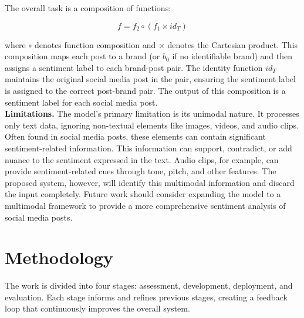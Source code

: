 \documentclass{article}
\begin{document}
The overall task is a composition of functions:

\[
    f = f_2 \circ (f_1 \times id_T)
\]

where $\circ$ denotes function composition and $\times$ denotes the Cartesian
product. This composition maps each post to a brand (or $b_0$ if no
identifiable brand) and then assigns a sentiment label to each brand-post pair.
The identity function $id_T$ maintains the original social media post in the
pair, ensuring the sentiment label is assigned to the correct post-brand pair.
The output of this composition is a sentiment label for each social media
post.\\

\newpage
\textbf{Limitations.} The model's primary limitation is its unimodal nature. It
processes only text data, ignoring non-textual elements like images, videos,
and audio clips. Often found in social media posts, these elements can contain
significant sentiment-related information. This information can support,
contradict, or add nuance to the sentiment expressed in the text. Audio clips,
for example, can provide sentiment-related cues through tone, pitch, and other
features. The proposed system, however, will identify this multimodal
information and discard the input completely. Future work should consider
expanding the model to a multimodal framework to provide a more comprehensive
sentiment analysis of social media posts.

\section{Methodology}

The work is divided into four stages: assessment, development, deployment, and
evaluation. Each stage informs and refines previous stages, creating a feedback
loop that continuously improves the overall system.
\end{document}
